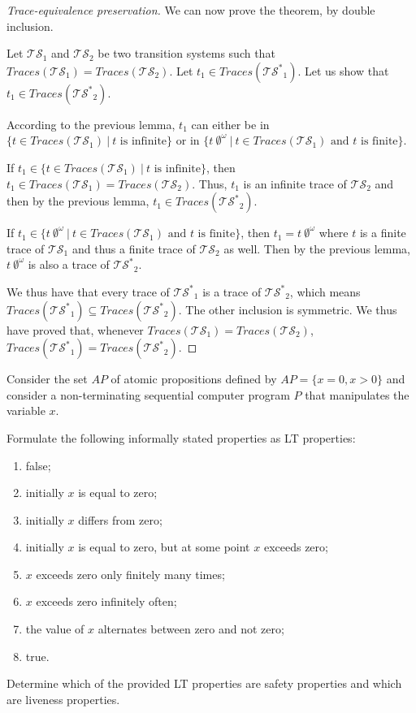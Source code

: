 \documentclass[11pt,a4paper]{article}
\def\ts{\mathcal{TS}}
\def\tss{\mathcal{TS^*}}
\def\traces{\mathit{Traces}}
\begin{document}
\begin{Answer}
\begin{proof}[Trace-equivalence preservation] We can now prove the theorem, by double inclusion.

Let $\ts_1$ and $\ts_2$ be two transition systems such that $\traces(\ts_1)=\traces(\ts_2)$. Let $t_1\in\traces(\tss_1)$. Let us show that $t_1\in\traces(\tss_2)$.

According to the previous lemma, $t_1$ can either be in $\{t\in\traces(\ts_1)~|~t\text{ is infinite}\}$ or in $\{t\ \emptyset^\omega~|~t\in\traces(\ts_1)\text{ and $t$ is finite}\}$.

If $t_1\in\{t\in\traces(\ts_1)~|~t\text{ is infinite}\}$, then $t_1\in\traces(\ts_1)=\traces(\ts_2)$. Thus, $t_1$ is an infinite trace of $\ts_2$ and then by the previous lemma, $t_1\in\traces(\tss_2)$.

If $t_1\in\{t\ \emptyset^\omega~|~t\in\traces(\ts_1)\text{ and $t$ is finite}\}$, then $t_1=t\ \emptyset^\omega$ where $t$ is a finite trace of $\ts_1$ and thus a finite trace of $\ts_2$ as well. Then by the previous lemma, $t\ \emptyset^\omega$ is also a trace of $\tss_2$.

We thus have that every trace of $\tss_1$ is a trace of $\tss_2$, which means $\traces(\tss_1)\subseteq\traces(\tss_2)$. The other inclusion is symmetric. We thus have proved that, whenever $\traces(\ts_1)=\traces(\ts_2)$, $\traces(\tss_1)=\traces(\tss_2)$.
\end{proof}
\end{Answer}

\begin{Exercise}

Consider the set $AP$ of atomic propositions defined by $AP = \{ x = 0,x > 0 \}$ and consider a non-terminating sequential computer program $P$ that manipulates the variable $x$.

Formulate the following informally stated properties as LT properties:
\begin{enumerate}
\item false;
\item initially $x$ is equal to zero;
\item initially $x$ differs from zero;
\item initially $x$ is equal to zero, but at some point $x$ exceeds zero;
\item $x$ exceeds zero only finitely many times;
\item $x$ exceeds zero infinitely often;
\item the value of $x$ alternates between zero and not zero;
\item true.
\end{enumerate}

Determine which of the provided LT properties are
safety properties and which are liveness properties.
\end{Exercise}
\end{document}
